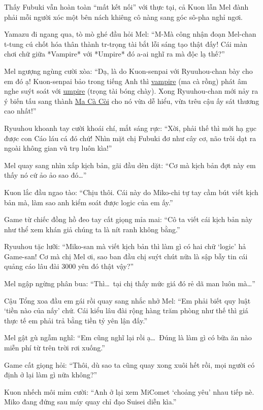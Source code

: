 \documentclass[../main.tex]{subfiles}
\begin{document}
Thấy Fubuki vẫn hoàn toàn ``mất kết nối'' với thực tại, cả Kuon lẫn Mel đành phải mỗi người xóc một bên nách khiêng cô nàng sang góc sô-pha nghỉ ngơi.

Yamazu đi ngang qua, tò mò ghé đầu hỏi Mel: ``M-Mà công nhận đoạn Mel-chan t-tung cú chốt hóa thân thành tr-trọng tài bắt lỗi sáng tạo thật đấy! Cái màn chơi chữ giữa *Vampire* với *Umpire* đó a-ai nghĩ ra mà độc lạ thế?''

Mel ngượng ngùng cười xòa: ``Dạ, là do Kuon-senpai với Ryuuhou-chan bày cho em đó ạ! Kuon-senpai bảo trong tiếng Anh thì \uline{vampire} (ma cà rồng) phát âm nghe suýt soát với \uline{umpire} (trọng tài bóng chày). Xong Ryuuhou-chan mới nảy ra ý biến tấu sang thành \uline{Ma Cà Còi} cho nó vừa dễ hiểu, vừa trêu cậu ấy sát thương cao nhất!''

Ryuuhou khoanh tay cười khoái chí, mắt sáng rực: ``Xời, phải thế thì mới hạ gục được con Cáo láu cá đó chứ! Nhìn mặt chị Fubuki đơ như cây cơ, não trôi dạt ra ngoài không gian vũ trụ luôn kìa!''

Mel quay sang nhìn xấp kịch bản, gãi đầu dèn dặt: ``Cơ mà kịch bản đợt này em thấy nó cứ ảo ảo sao đó\dots''

Kuon lắc đầu ngao tào: ``Chịu thôi. Cái này do Miko-chi tự tay cầm bút viết kịch bản mà, làm sao anh kiểm soát được logic của em ấy.''

Game từ chiếc đồng hồ đeo tay cất giọng mỉa mai: ``Cô ta viết cái kịch bản này như thể xem khán giả chúng ta là nít ranh không bằng.''

Ryuuhou tặc lưỡi: ``Miko-san mà viết kịch bản thì làm gì có hai chữ `logic' hả Game-san! Cơ mà chị Mel ơi, sao ban đầu chị suýt chút nữa là sập bẫy tin cái quảng cáo lâu đài 3000 yên đó thật vậy?''

Mel ngập ngừng phân bua: ``Thì\dots\ tại chị thấy mức giá đó rẻ dã man luôn mà\dots''

Cậu Tổng xoa đầu em gái rồi quay sang nhắc nhở Mel: ``Em phải biết quy luật `tiền nào của nấy' chứ. Cái kiểu lâu đài rộng hàng trăm phòng như thế thì giá thực tế em phải trả bằng tiền tỷ yên lận đấy.''

Mel gật gù ngẫm nghĩ: ``Em cũng nghĩ lại rồi ạ\dots\ Đúng là làm gì có bữa ăn nào miễn phí từ trên trời rơi xuống.''

Game cất giọng hỏi: ``Thôi, dù sao ta cũng quay xong xuôi hết rồi, mọi người có định ở lại làm gì nữa không?''

Kuon nhếch môi mỉm cười: ``Anh ở lại xem MiComet `choảng yêu' nhau tiếp nè. Miko đang đứng sau máy quay chỉ đạo Suisei diễn kìa.''
\end{document}
